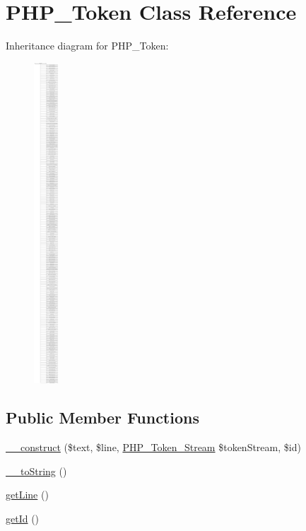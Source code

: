 \hypertarget{class_p_h_p___token}{}\section{P\+H\+P\+\_\+\+Token Class Reference}
\label{class_p_h_p___token}
Inheritance diagram for P\+H\+P\+\_\+\+Token\+:\begin{figure}[H]
\begin{center}
\leavevmode
\includegraphics[height=12.000000cm]{class_p_h_p___token}
\end{center}
\end{figure}
\subsection*{Public Member Functions}
\begin{DoxyCompactItemize}
\item 
\mbox{\hyperlink{class_p_h_p___token_a964082b4a027ef6b5e11976d90cf21b6}{\+\_\+\+\_\+construct}} (\$text, \$line, \mbox{\hyperlink{class_p_h_p___token___stream}{P\+H\+P\+\_\+\+Token\+\_\+\+Stream}} \$token\+Stream, \$id)
\item 
\mbox{\hyperlink{class_p_h_p___token_a7516ca30af0db3cdbf9a7739b48ce91d}{\+\_\+\+\_\+to\+String}} ()
\item 
\mbox{\hyperlink{class_p_h_p___token_aef9c32f6066788a101028a1d4150f8cb}{get\+Line}} ()
\item 
\mbox{\hyperlink{class_p_h_p___token_a12251d0c022e9e21c137a105ff683f13}{get\+Id}} ()
\end{DoxyCompactItemize}
